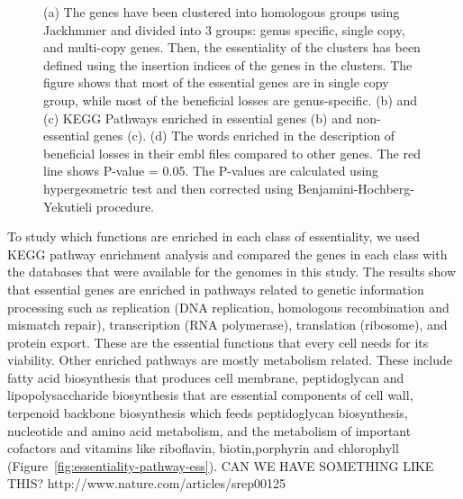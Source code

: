 \documentclass[12pt,letterpaper]{article}
\begin{document}
\begin{figure}
\begin{subfigure}{.5\textwidth}
  \caption{}
  \label{fig:essentiality-pathway-ben}
\end{subfigure}
\caption{(a) The genes have been clustered into homologous groups using Jackhmmer and divided into 3 groups: genus specific, single copy, and multi-copy genes. Then, the essentiality of the clusters has been defined using the insertion indices of the genes in the clusters. The figure shows that most of the essential genes are in single copy group, while most of the beneficial losses are genus-specific. (b) and (c) KEGG Pathways enriched in essential genes (b) and non-essential genes (c). (d) The words enriched in the description of beneficial losses in their embl files compared to other genes. The red line shows P-value = 0.05. The P-values are calculated using hypergeometric test and then corrected using Benjamini-Hochberg-Yekutieli procedure.}
\label{fig:gene-classes}
\end{figure}


To study which functions are enriched in each class of essentiality, we used KEGG pathway enrichment analysis \cite{kanehisa_kegg:_2000} and compared the genes in each class with the databases that were available for the genomes in this study. The results show that essential genes are enriched in pathways related to genetic information processing such as replication (DNA replication, homologous recombination and mismatch repair), transcription (RNA polymerase), translation (ribosome), and protein export. These are the essential functions that every cell needs for its viability. Other enriched pathways are mostly metabolism related. These include fatty acid biosynthesis that produces cell membrane, peptidoglycan and lipopolysaccharide biosynthesis that are essential components of cell wall, terpenoid backbone biosynthesis which feeds peptidoglycan biosynthesis, nucleotide and amino acid metabolism, and the metabolism of important cofactors and vitamins like riboflavin, biotin,porphyrin and chlorophyll (Figure~\ref{fig:essentiality-pathway-ess}).
{\color{red} CAN WE HAVE SOMETHING LIKE THIS? http://www.nature.com/articles/srep00125}
\end{document}
